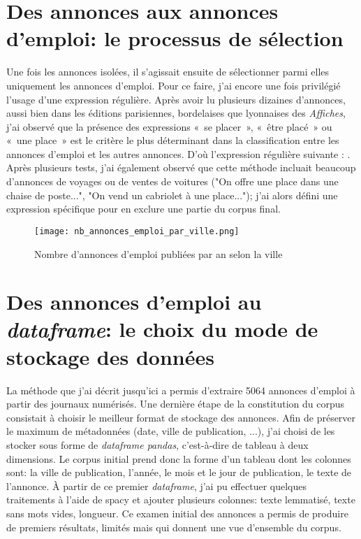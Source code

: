 \section{Des annonces aux annonces d'emploi: le processus de sélection}

Une fois les annonces isolées, il s'agissait ensuite de sélectionner parmi elles uniquement les annonces d'emploi. Pour ce faire, j'ai encore une fois privilégié l'usage d'une expression régulière. Après avoir lu plusieurs dizaines d'annonces, aussi bien dans les éditions parisiennes, bordelaises que lyonnaises des \textit{Affiches}, j'ai observé que la présence des expressions « se placer », « être placé » ou « une place » est le critère le plus déterminant dans la classification entre les annonces d’emploi et les autres annonces. D'où l'expression régulière suivante : . Après plusieurs tests, j'ai également observé que cette méthode incluait beaucoup d'annonces de voyages ou de ventes de voitures ("On offre une place dans une chaise de poste...", "On vend un cabriolet à une place..."); j'ai alors défini une expression spécifique pour en exclure une partie du corpus final.


\begin{figure}[ht]
	\centering
	\texttt{[image: nb\_annonces\_emploi\_par\_ville.png]}
	\caption{Nombre d'annonces d'emploi publiées par an selon la ville}
\end{figure}


\section{Des annonces d'emploi au  \textit{dataframe}: le choix du mode de stockage des données}

La méthode que j'ai décrit jusqu'ici a permis d'extraire 5064 annonces d'emploi à partir des journaux numérisés. Une dernière étape de la constitution du corpus consistait à choisir le meilleur format de stockage des annonces. Afin de préserver le maximum de métadonnées (date, ville de publication, ...), j'ai choisi de les stocker sous forme de \textit{dataframe pandas}, c'est-à-dire de tableau à deux dimensions. Le corpus initial prend donc la forme d'un tableau dont les colonnes sont: la ville de publication, l'année, le mois et le jour de publication, le texte de l'annonce. 
À partir de ce premier \textit{dataframe}, j'ai pu effectuer quelques traitements à l'aide de spacy et ajouter plusieurs colonnes: texte lemmatisé, texte sans mots vides, longueur. Ce examen initial des annonces a permis de produire de premiers résultats, limités mais qui donnent une vue d'ensemble du corpus. 

